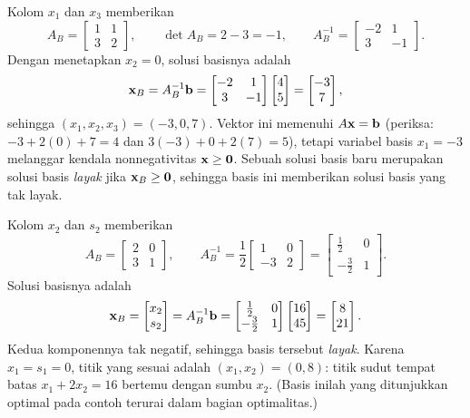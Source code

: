 
Kolom $x_1$ dan $x_3$ memberikan
\[
A_B =
\begin{bmatrix}
1 & 1 \\
3 & 2
\end{bmatrix},
\qquad
\det A_B = 2 - 3 = -1,
\qquad
A_B^{-1} =
\begin{bmatrix}
-2 & 1 \\
3 & -1
\end{bmatrix}.
\]
Dengan menetapkan $x_2 = 0$, solusi basisnya adalah
\[
\mathbf{x}_B = A_B^{-1}\mathbf{b} =
\begin{bmatrix}
-2 & 1 \\
3 & -1
\end{bmatrix}
\begin{bmatrix}
4 \\ 5
\end{bmatrix}
=
\begin{bmatrix}
-3 \\ 7
\end{bmatrix},
\]
sehingga $(x_1, x_2, x_3) = (-3, 0, 7)$. Vektor ini memenuhi $A\mathbf{x} = \mathbf{b}$
(periksa:
$-3 + 2(0) + 7 = 4$ dan $3(-3) + 0 + 2(7) = 5$), tetapi variabel basis
$x_1 = -3$ melanggar kendala nonnegativitas $\mathbf{x} \geq \mathbf{0}$. Sebuah solusi
basis baru merupakan solusi basis \emph{layak} jika $\mathbf{x}_B \geq \mathbf{0}$,
sehingga basis ini memberikan solusi basis yang tak layak.


Kolom $x_2$ dan $s_2$ memberikan
\[
A_B =
\begin{bmatrix}
2 & 0 \\
3 & 1
\end{bmatrix},
\qquad
A_B^{-1} = \frac{1}{2}
\begin{bmatrix}
1 & 0 \\
-3 & 2
\end{bmatrix}
=
\begin{bmatrix}
\tfrac12 & 0 \\
-\tfrac32 & 1
\end{bmatrix}.
\]
Solusi basisnya adalah
\[
\mathbf{x}_B =
\begin{bmatrix} x_2 \\ s_2 \end{bmatrix}
= A_B^{-1}\mathbf{b} =
\begin{bmatrix}
\tfrac12 & 0 \\
-\tfrac32 & 1
\end{bmatrix}
\begin{bmatrix}
16 \\ 45
\end{bmatrix}
=
\begin{bmatrix}
8 \\ 21
\end{bmatrix}.
\]
Kedua komponennya tak negatif, sehingga basis tersebut \emph{layak}. Karena
$x_1 = s_1 = 0$, titik yang sesuai adalah $(x_1, x_2) = (0, 8)$:
titik sudut tempat batas $x_1 + 2x_2 = 16$ bertemu dengan sumbu $x_2$. (Basis
inilah yang ditunjukkan optimal pada contoh terurai dalam bagian optimalitas.)

